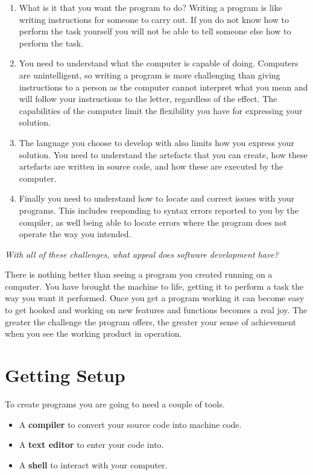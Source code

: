 \begin{enumerate}
  \item What is it that you want the program to do? Writing a program is like writing instructions for someone to carry out. If you do not know how to perform the task yourself you will not be able to tell someone else how to perform the task.
  \item You need to understand what the computer is capable of doing. Computers are unintelligent, so writing a program is more challenging than giving instructions to a person as the computer cannot interpret what you mean and will follow your instructions to the letter, regardless of the effect. The capabilities of the computer limit the flexibility you have for expressing your solution.
  \item The language you choose to develop with also limits how you express your solution. You need to understand the artefacts that you can create, how these artefacts are written in source code, and how these are executed by the computer.
  \item Finally you need to understand how to locate and correct issues with your programs. This includes responding to syntax errors reported to you by the compiler, as well being able to locate errors where the program does not operate the way you intended. 
\end{enumerate}

\emph{With all of these challenges, what appeal does software development have?}

There is nothing better than seeing a program you created running on a computer. You have brought the machine to life, getting it to perform a task the way you want it performed. Once you get a program working it can become easy to get hooked and working on new features and functions becomes a real joy. The greater the challenge the program offers, the greater your sense of achievement when you see the working product in operation.



\section{Getting Setup} %
\label{sec:getting_setup}

To create programs you are going to need a couple of tools.

\begin{itemize}
  \item A \textbf{compiler} to convert your source code into machine code.
  \item A \textbf{text editor} to enter your code into.
  \item A \textbf{shell} to interact with your computer.
\end{itemize}



